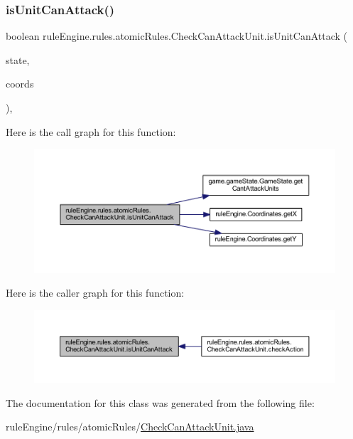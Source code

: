 \subsubsection{\texorpdfstring{is\+Unit\+Can\+Attack()}{isUnitCanAttack()}}
{\footnotesize\ttfamily boolean rule\+Engine.\+rules.\+atomic\+Rules.\+Check\+Can\+Attack\+Unit.\+is\+Unit\+Can\+Attack (\begin{DoxyParamCaption}\item[{\mbox{\hyperlink{classgame_1_1game_state_1_1_game_state}{Game\+State}}}]{state,  }\item[{\mbox{\hyperlink{classrule_engine_1_1_coordinates}{Coordinates}}}]{coords }\end{DoxyParamCaption})\hspace{0.3cm}{\ttfamily [inline]}, {\ttfamily [private]}}

Here is the call graph for this function\+:
\nopagebreak
\begin{figure}[H]
\begin{center}
\leavevmode
\includegraphics[width=350pt]{classrule_engine_1_1rules_1_1atomic_rules_1_1_check_can_attack_unit_a3cf631790ea887c5d1fe3a438f3224dc_cgraph}
\end{center}
\end{figure}
Here is the caller graph for this function\+:
\nopagebreak
\begin{figure}[H]
\begin{center}
\leavevmode
\includegraphics[width=350pt]{classrule_engine_1_1rules_1_1atomic_rules_1_1_check_can_attack_unit_a3cf631790ea887c5d1fe3a438f3224dc_icgraph}
\end{center}
\end{figure}


The documentation for this class was generated from the following file\+:\begin{DoxyCompactItemize}
\item 
rule\+Engine/rules/atomic\+Rules/\mbox{\hyperlink{_check_can_attack_unit_8java}{Check\+Can\+Attack\+Unit.\+java}}\end{DoxyCompactItemize}
